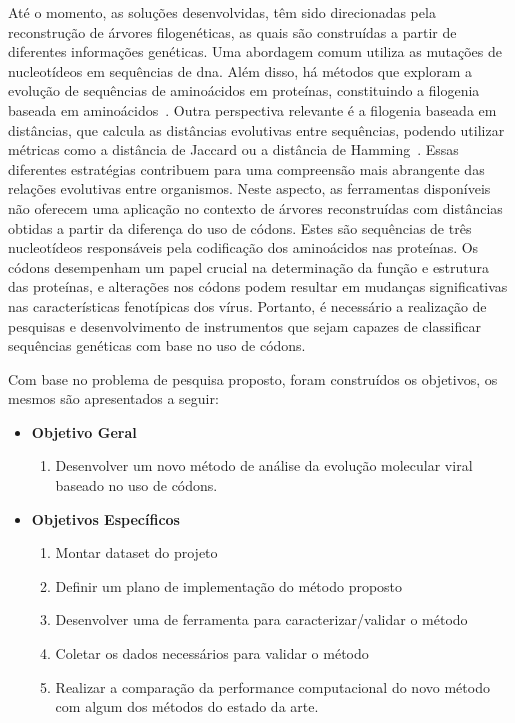 Até o momento, as soluções desenvolvidas, têm sido direcionadas pela reconstrução de árvores filogenéticas, as quais são construídas a partir de diferentes informações genéticas. Uma abordagem comum utiliza as mutações de nucleotídeos em sequências de \gls{dna}. Além disso, há métodos que exploram a evolução de sequências de aminoácidos em proteínas, constituindo a filogenia baseada em aminoácidos~\cite{protein_le_2008}. Outra perspectiva relevante é a filogenia baseada em distâncias, que calcula as distâncias evolutivas entre sequências, podendo utilizar métricas como a distância de Jaccard ou a distância de Hamming~\cite{sokal_statistical_method_1958}. Essas diferentes estratégias contribuem para uma compreensão mais abrangente das relações evolutivas entre organismos. Neste aspecto, as ferramentas disponíveis não oferecem uma aplicação no contexto de árvores reconstruídas com distâncias obtidas a partir da diferença do uso de códons. Estes são sequências de três nucleotídeos responsáveis pela codificação dos aminoácidos nas proteínas. Os códons desempenham um papel crucial na determinação da função e estrutura das proteínas, e alterações nos códons podem resultar em mudanças significativas nas características fenotípicas dos vírus. Portanto, é necessário a realização de pesquisas e desenvolvimento de instrumentos que sejam capazes de classificar sequências genéticas com base no uso de códons.

Com base no problema de pesquisa proposto, foram construídos os objetivos, os mesmos são apresentados a seguir:
\begin{itemize}
      \item \textbf{Objetivo Geral}
            \begin{enumerate}[label=~(\roman*)]
                  \item Desenvolver um novo método de análise da evolução molecular viral baseado no uso de códons.
            \end{enumerate}
      \item \textbf{Objetivos Específicos}
            \begin{enumerate}[label=~(\roman*)]
                  \item Montar dataset do projeto
                  \item Definir um plano de implementação do método proposto
                  \item Desenvolver uma de ferramenta para caracterizar/validar o método
                  \item Coletar os dados necessários para validar o método
                  \item Realizar a comparação da performance computacional do novo método com algum dos métodos do estado da arte.
            \end{enumerate}
\end{itemize}

